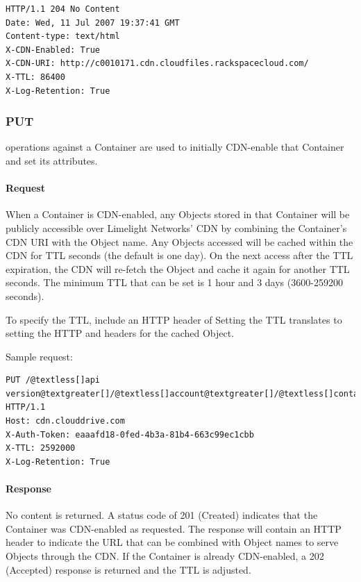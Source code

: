 \documentclass[letterpaper,10pt,english]{manual}
\begin{document}
\begin{Verbatim}[commandchars=@\[\]]
HTTP/1.1 204 No Content
Date: Wed, 11 Jul 2007 19:37:41 GMT
Content-type: text/html
X-CDN-Enabled: True
X-CDN-URI: http://c0010171.cdn.cloudfiles.rackspacecloud.com/
X-TTL: 86400
X-Log-Retention: True
\end{Verbatim}


\subsubsection{PUT}

 operations against a Container are used to initially CDN-enable
that Container and set its attributes.


\paragraph{Request}

When a Container is CDN-enabled, any Objects stored in that Container
will be publicly accessible over Limelight Networks' CDN by combining
the Container's CDN URI with the Object name.  Any Objects accessed will
be cached within the CDN for TTL seconds (the default is one day).  On
the next access after the TTL expiration, the CDN will re-fetch the
Object and cache it again for another TTL seconds.  The minimum TTL that
can be set is 1 hour and 3 days (3600-259200 seconds).

To specify the TTL, include an HTTP header of 
Setting the TTL translates to setting the HTTP  and
 headers for the cached Object.

Sample request:

\begin{Verbatim}[commandchars=@\[\]]
PUT /@textless[]api version@textgreater[]/@textless[]account@textgreater[]/@textless[]container@textgreater[] HTTP/1.1
Host: cdn.clouddrive.com
X-Auth-Token: eaaafd18-0fed-4b3a-81b4-663c99ec1cbb
X-TTL: 2592000
X-Log-Retention: True
\end{Verbatim}


\paragraph{Response}

No content is returned. A status code of 201 (Created) indicates that
the Container was CDN-enabled as requested. The response will contain
an HTTP header to indicate the URL that can be combined with Object names
to serve Objects through the CDN.  If the Container is already
CDN-enabled, a 202 (Accepted) response is returned and the TTL is
adjusted.
\end{document}
